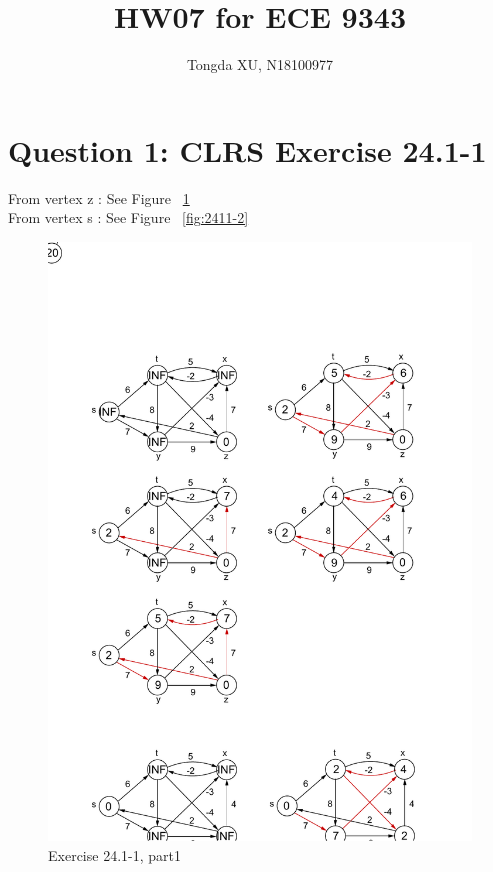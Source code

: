 \documentclass[]{article}
\title{HW07 for ECE 9343}
\author{Tongda XU, N18100977}
\begin{document}
\maketitle

\section{Question 1: CLRS Exercise 24.1-1}

From vertex z : See Figure ~\ref{fig:2411-1}\\
From vertex s : See Figure ~\ref{fig:2411-2}

\begin{figure}
	\centering
	\includegraphics[width=\linewidth]{2411-1}
	\caption{Exercise 24.1-1, part1}
	\label{fig:2411-1}
\end{figure}
\end{document}
